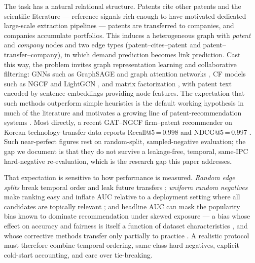 \documentclass[preprint,12pt]{elsarticle}
\begin{document}
The task has a natural relational structure. Patents cite other patents and the
scientific literature --- reference signals rich enough to have motivated dedicated
large-scale extraction pipelines \cite{abbasiantaeb2025} --- patents are transferred
to companies, and companies accumulate portfolios. This induces a heterogeneous
graph with \emph{patent} and \emph{company} nodes and two edge types
(patent--cites--patent and patent--transfer--company), in which demand prediction
becomes link prediction. Cast this way, the problem invites graph representation
learning and collaborative filtering: GNNs such as GraphSAGE \cite{hamilton2017}
and graph attention networks \cite{velickovic2018,brody2022}, CF models such as NGCF
\cite{wang2019} and LightGCN \cite{he2020}, and matrix factorization \cite{rendle2009},
with patent text encoded by sentence embeddings \cite{reimers2019} providing node
features. The expectation that such methods outperform simple heuristics is the
default working hypothesis in much of the literature and motivates a growing line of
patent-recommendation systems \cite{krestel2021,choi2019,chendeng2023,liu2024}. Most
directly, a recent GAT--NGCF firm--patent recommender on Korean technology-transfer
data reports Recall@5\,=\,0.998 and NDCG@5\,=\,0.997 \cite{kim2025}. Such
near-perfect figures rest on random-split, sampled-negative evaluation; the
gap we document is that they do not survive a leakage-free, temporal, same-IPC
hard-negative re-evaluation, which is the research gap this paper addresses.

That expectation is sensitive to how performance is measured. \emph{Random edge
splits} break temporal order and leak future transfers \cite{meng2020};
\emph{uniform random negatives} make ranking easy and inflate AUC relative to a
deployment setting where all candidates are topically relevant \cite{krichene2020};
and headline AUC can mask the popularity bias known to dominate recommendation under
skewed exposure \cite{abdollahpouri2019,steck2018,zhu2021,boratto2021} --- a bias
whose effect on accuracy and fairness is itself a function of dataset characteristics
\cite{deldjoo2021}, and whose corrective methods transfer only partially to practice
\cite{boratto2023}. A realistic protocol must therefore combine temporal ordering,
same-class hard negatives, explicit cold-start accounting, and care over tie-breaking.
\end{document}
